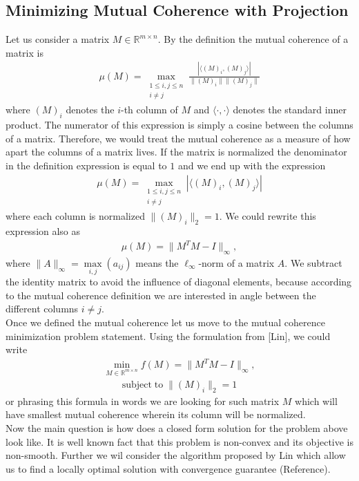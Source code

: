 \documentclass[journal]{IEEEtran}
\begin{document}
\subsection{Minimizing Mutual Coherence with Projection}
Let us consider a matrix $ M\in \mathbb{ R}^{m\times n}$. By the definition the mutual coherence of a matrix is
\begin{align}
\mu(M)=\max\limits_{\substack{1\leq i,j \leq n \\ i\neq j}}\frac{|\langle (M)_i, (M)_j \rangle |}{\|(M)_i\| \|(M)_j\|}
\end{align}
where $ (M)_i$ denotes the $i$-th column of $M$ and $\langle\cdot , \cdot \rangle $ denotes the standard inner product. The numerator of this expression is simply a cosine between the columns of a matrix. Therefore, we would treat the mutual coherence as a measure of how apart the columns of a matrix lives.  If the matrix is normalized the denominator in the definition expression is equal to $1$ and we end up with  the expression
\begin{align}
\mu(M)=\max\limits_{\substack{1\leq i,j \leq n \\ i\neq j}}|\langle (M)_i, (M)_j \rangle |
\end{align}
where each column is normalized $ \|(M)_i\|_2=1$.  We could rewrite this expression also as
\begin{align}
\mu(M)=\|M^TM-I\|_{\infty},
\end{align}
where $\|A \|_{\infty}=\max\limits_{i,j}(a_{ij})$ means the $\ell_{\infty}$-norm of a matrix $A$. We subtract the identity matrix to avoid the influence of diagonal elements, because according to the mutual coherence definition we are interested in angle between the different columns $i\neq j$. \\
Once we defined the mutual coherence let us move to the mutual coherence minimization problem statement.  Using the formulation from [Lin], we could write
\begin{align}
\min_{M\in\mathbb{R}^{m\times n}}f(M)=\|M^TM-I\|_{\infty},
\end{align}
\begin{align}
\textrm{subject}\;\textrm{to} \;\|(M)_i\|_2=1
\end{align}
or phrasing this formula  in words we are looking for such matrix $M$ which will have smallest mutual coherence wherein its column will be normalized. \\
Now the main question is how does a closed form solution for the problem above look like. It is well known fact that this problem is non-convex and its objective is non-smooth. Further we wil consider the algorithm proposed by Lin which allow us to find a locally optimal solution with convergence guarantee (Reference). \\
\end{document}
